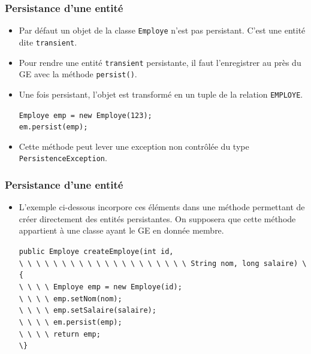 \documentclass[xcolor=pdftex,x11names,table]{beamer}
\begin{document}
  \begin{frame}
    \frametitle{Persistance d'une entité}
    \begin{itemize}
		  \item Par défaut un objet de la classe \texttt{Employe} n'est pas persistant. C'est une entité dite \texttt{transient}.
		  \item Pour rendre une entité \texttt{transient} persistante, il faut l'enregistrer au près du GE avec la méthode \lstinline$persist()$.
		  \item Une fois persistant, l'objet est transformé en un tuple de la relation \texttt{EMPLOYE}.
				\begin{block}{}
					\lstinline$Employe emp = new Employe(123);$\\
					\lstinline$em.persist(emp);$\\
				\end{block}
			\item Cette méthode peut lever une exception non contrôlée du type \texttt{PersistenceException}.
		\end{itemize}
  \end{frame}
  \begin{frame}
    \frametitle{Persistance d'une entité}
    \begin{itemize}
		  \item L'exemple ci-dessous incorpore ces éléments dans une méthode permettant de créer directement des entités 
		  persistantes. On supposera que cette méthode appartient à une classe ayant le GE en donnée membre.
				\begin{block}{}
					\lstinline$public Employe createEmploye(int id,$\\
					\lstinline$\ \ \ \ \ \ \ \ \ \ \ \ \ \ \ \ \ \ \ \ String nom, long salaire) \{$\\
					\lstinline$\ \ \ \ Employe emp = new Employe(id);$\\
					\lstinline$\ \ \ \ emp.setNom(nom);$\\
					\lstinline$\ \ \ \ emp.setSalaire(salaire);$\\
					\lstinline$\ \ \ \ em.persist(emp);$\\
					\lstinline$\ \ \ \ return emp;$\\
					\lstinline$\}$\\
				\end{block}
		\end{itemize}
  \end{frame}
  
\end{document}
